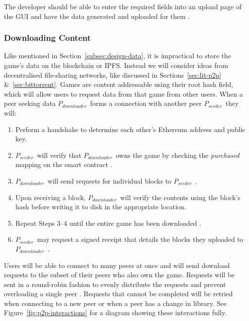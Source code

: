 \newparagraph
The developer should be able to enter the required fields into an upload page of the GUI and have the data generated and uploaded for them .

\subsubsection*{Downloading Content}

\newcommand{\seeder}{$P_{seeder}$~}
\newcommand{\downloader}{$P_{downloader}$~}

Like mentioned in Section~\ref{subsec:design-data}, it is impractical to store the game's data on the blockchain or IPFS. Instead we will consider ideas from decentralised file-sharing networks, like discussed in Sections~\ref{sec:lit-p2p} \&~\ref{sec:bittorrent}.
\x
Games are content addressable using their root hash field, which will allow users to request data from that game from other users. When a peer seeking data \downloader forms a connection with another peer \seeder they will:

\begin{enumerate}
  \item Perform a handshake to determine each other's Ethereum address and public key.
  \item \seeder will verify that \downloader owns the game by checking the \textit{purchased} mapping on the smart contract  .
  \item \downloader will send requests for individual blocks to \seeder {}.
  \item Upon receiving a block, \downloader will verify the contents using the block's hash  before writing it to disk in the appropriate location.
  \item Repeat Steps 3--4 until the entire game has been downloaded .
  \item \seeder may request a signed receipt that details the blocks they uploaded  to \downloader.
\end{enumerate}

\newparagraph
Users will be able to connect to many peers at once  and will send download requests to the subset of their peers who also own the game. Requests will be sent in a round-robin fashion to evenly distribute the requests and prevent overloading a single peer . Requests that cannot be completed will be retried when connecting to a new peer or when a peer has a change in library.
\x
See Figure~\ref{fig:p2p-interactions} for a diagram showing these interactions fully.

